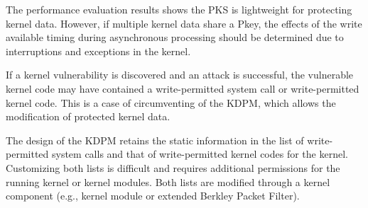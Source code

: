 The performance evaluation results shows the PKS is lightweight for protecting
kernel data.
%
However, if multiple kernel data share a Pkey, 
the effects of the write available timing during asynchronous processing should
be determined due to interruptions and exceptions in the kernel. 
% 


If a kernel vulnerability is discovered and an attack is successful, the
vulnerable kernel code may have contained a write-permitted system call or
write-permitted kernel code. This is a case of circumventing of the KDPM, which
allows the modification of protected kernel data.

The design of the KDPM retains the static information in the list of write-permitted system
calls and that of write-permitted kernel codes for the kernel. %
Customizing both lists is difficult and requires additional permissions for the
running kernel or kernel modules. 
%
Both lists are modified through a kernel component (e.g., kernel module or
extended Berkley Packet Filter).

 




